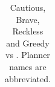\documentclass[11pt,landscape]{article}
\begin{document}
\begin{table}[tb]
{\begin{tabular}{|l||ccccc||ccccc||ccccc||ccccc||}
        \end{tabular}}
        \caption{Cautious, Brave, Reckless and Greedy \pattyd vs \pattyo. Planner names are abbreviated.}
        \label{tab:cbrg}
        \end{table}
        
\end{document}
